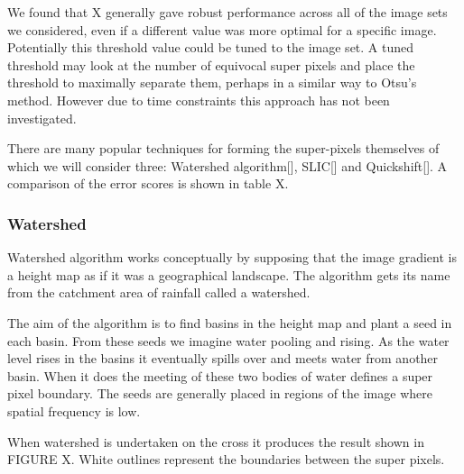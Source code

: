 \documentclass[12pt]{IIBproject}
\begin{document}
We found that X generally gave robust performance across all of the image sets we considered, even if a different value was more optimal for a specific image. Potentially this threshold value could be tuned to the image set. A tuned threshold may look at the number of equivocal super pixels and place the threshold to maximally separate them, perhaps in a similar way to Otsu's method. However due to time constraints this approach has not been investigated. 

There are many popular techniques for forming the super-pixels themselves of which we will consider three: Watershed algorithm[], SLIC[] and Quickshift[]. A comparison of the error scores is shown in table X.



\subsubsection{Watershed}
Watershed algorithm works conceptually by supposing that the image gradient is a height map as if it was a geographical landscape. The algorithm gets its name from the catchment area of rainfall called a watershed. 

The aim of the algorithm is to find basins in the height map and plant a seed in each basin. From these seeds we imagine water pooling and rising. As the water level rises in the basins it eventually spills over and meets water from another basin. When it does the meeting of these two bodies of water defines a super pixel boundary. The seeds are generally placed in regions of the image where spatial frequency is low.
 
When watershed is undertaken on the cross it produces the result shown in FIGURE X. White outlines represent the boundaries between the super pixels.
\end{document}
